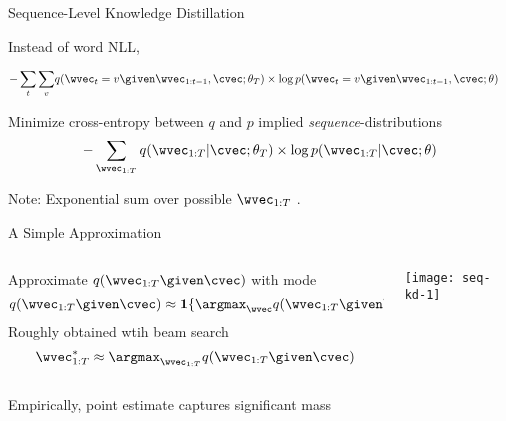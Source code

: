

\begin{frame}{Sequence-Level Knowledge Distillation}
\air 
\air
\air  

Instead of word NLL, 

\begin{align*}
-\sum_t \sum_v &q(\wvec_t=v \given \wvec_{1: t-1}, \cvec ; \theta_T)\times  \log p(\wvec_t =v \given \wvec_{1: t-1}, \cvec ; \theta)
\end{align*}
 

Minimize cross-entropy between $q$ and $p$ implied \emph{sequence}-distributions 
\[
 -\sum_{\wvec_{1:T}} q(\wvec_{1:T} | \cvec; \theta_T) \times \log p(\wvec_{1:T} | \cvec ; \theta)
\]
\air

Note: Exponential sum over possible $\wvec_{1:T}$ . \\ 
\air
\air

\end{frame}

\begin{frame}{A Simple Approximation}
\air 
\air

\begin{columns}
\begin{column}{6cm}
Approximate $q(\wvec_{1:T} \given \cvec )$ with mode
$$q(\wvec_{1:T} \given \cvec ) \approx \mathbf{1}\{\argmax_{\wvec} q(\wvec_{1:T} \given \cvec )\}$$
\air
Roughly obtained wtih  beam search 
$$ \wvec^*_{1:T} \approx  \argmax_{\wvec_{1:T}} q(\wvec_{1:T} \given \cvec ) $$
\\
Empirically, point estimate captures 
significant mass

\end{column}
\begin{column}{8cm}
\texttt{[image: seq-kd-1]}
\end{column}
\end{columns}
\end{frame}

